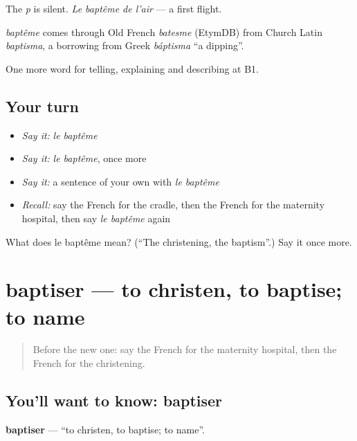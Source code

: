 The \emph{p} is silent. \emph{Le baptême de l'air} — a first flight.

\begin{cousinweb}
\emph{baptême} comes through Old French \emph{batesme} (EtymDB) from Church Latin \emph{baptisma}, a borrowing from Greek \emph{báptisma} \textquotedblleft{}a dipping\textquotedblright{}.
\end{cousinweb}

\begin{grammarlens}[title={What you've built}]
One more word for telling, explaining and describing at B1.
\end{grammarlens}

\subsection*{Your turn}
\begin{itemize}
\raggedright
  \item \emph{Say it:} \emph{le baptême}
  \item \emph{Say it:} \emph{le baptême}, once more
  \item \emph{Say it:} a sentence of your own with \emph{le baptême}
  \item \emph{Recall:} say the French for the cradle, then the French for the maternity hospital, then say \emph{le baptême} again
\end{itemize}

\begin{tcolorbox}[breakable,colback=teal!4,colframe=teal!35!black,title={Before you move on}]
What does le baptême mean? (\textquotedblleft{}The christening, the baptism\textquotedblright{}.) Say it once more.
\end{tcolorbox}
\section[baptiser]{baptiser — to christen, to baptise; to name}

\label{lesson:FR-C309-baptiser}



\begin{quote}
Before the new one: say the French for the maternity hospital, then the French for the christening.
\end{quote}

\subsection*{You'll want to know: baptiser}
\textbf{baptiser} — \textquotedblleft{}to christen, to baptise; to name\textquotedblright{}.

